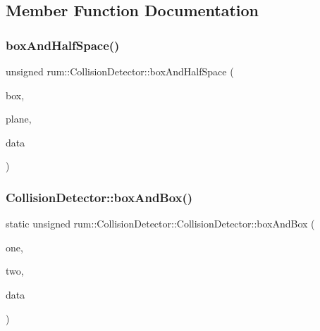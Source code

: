 \subsection{Member Function Documentation}
\mbox{\label{classrum_1_1_collision_detector_a6cbc4102877984c47a74d3be88559dac}} 
\subsubsection{\texorpdfstring{box\+And\+Half\+Space()}{boxAndHalfSpace()}}
{\footnotesize\ttfamily unsigned rum\+::\+Collision\+Detector\+::box\+And\+Half\+Space (\begin{DoxyParamCaption}\item[{const \hyperlink{classrum_1_1_collision_box}{Collision\+Box} \&}]{box,  }\item[{const \hyperlink{classrum_1_1_collision_plane}{Collision\+Plane} \&}]{plane,  }\item[{\hyperlink{classrum_1_1_collision_data}{Collision\+Data} $\ast$}]{data }\end{DoxyParamCaption})\hspace{0.3cm}{\ttfamily [static]}}

\mbox{\label{classrum_1_1_collision_detector_a54f8f7e13166eadb4d7b06025d9176bf}} 
\subsubsection{\texorpdfstring{Collision\+Detector\+::box\+And\+Box()}{CollisionDetector::boxAndBox()}}
{\footnotesize\ttfamily static unsigned rum\+::\+Collision\+Detector\+::\+Collision\+Detector\+::box\+And\+Box (\begin{DoxyParamCaption}\item[{const \hyperlink{classrum_1_1_collision_box}{Collision\+Box} \&}]{one,  }\item[{const \hyperlink{classrum_1_1_collision_box}{Collision\+Box} \&}]{two,  }\item[{\hyperlink{classrum_1_1_collision_data}{Collision\+Data} $\ast$}]{data }\end{DoxyParamCaption})\hspace{0.3cm}{\ttfamily [static]}}

